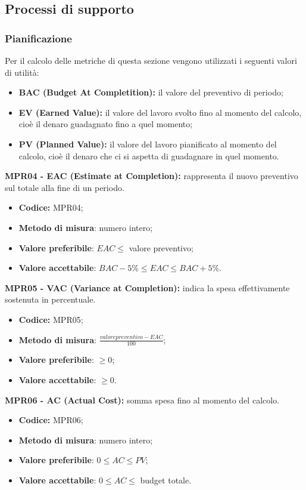 \subsection{Processi di supporto}
\subsubsection{Pianificazione}
Per il calcolo delle metriche di questa sezione vengono utilizzati i seguenti valori di utilità:
\begin{itemize}
    \item \textbf{BAC (Budget At Completition):} il valore del preventivo di periodo;
    \item \textbf{EV (Earned Value):}  il valore del lavoro svolto fino al momento del calcolo, cioè il denaro guadagnato fino a quel momento;
    \item \textbf{PV (Planned Value):} il valore del lavoro pianificato al momento del calcolo, cioè il denaro che ci si aspetta di guadagnare in quel momento.
\end{itemize}
\textbf{MPR04 - EAC (Estimate at Completion):} rappresenta il nuovo preventivo sul totale alla fine di un periodo.
\begin{itemize}
    \item \textbf{Codice:} MPR04;
    \item \textbf{Metodo di misura}: numero intero;
    \item \textbf{Valore preferibile}: $EAC \leq$ valore preventivo;
    \item \textbf{Valore accettabile}: $BAC -5\% \leq EAC \leq BAC +5\%.$
\end{itemize}
\textbf{MPR05 - VAC (Variance at Completion):} indica la spesa effettivamente sostenuta in percentuale.
\begin{itemize}
    \item \textbf{Codice:} MPR05;
    \item \textbf{Metodo di misura}: $\frac{valore preventivo - EAC}{100}$;
    \item \textbf{Valore preferibile}: $\geq 0$;
    \item \textbf{Valore accettabile}: $\geq 0$.
\end{itemize}
\textbf{MPR06 - AC (Actual Cost):} somma spesa fino al momento del calcolo.
\begin{itemize}
    \item \textbf{Codice:} MPR06;
    \item \textbf{Metodo di misura}: numero intero;
    \item \textbf{Valore preferibile}: $0 \leq AC \leq PV$;
    \item \textbf{Valore accettabile}: $0 \leq AC \leq$ budget totale.
\end{itemize}
